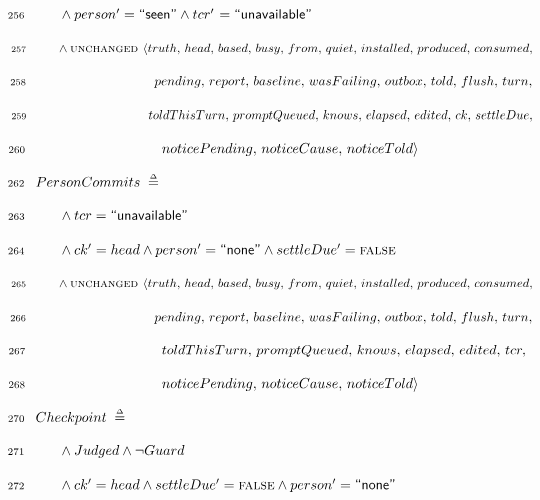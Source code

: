 \documentclass{article}
\makeatletter
\newcommand{\defeq}{\;\mathrel{\smash   %
    {{\stackrel{\scriptscriptstyle\Delta}{=}}}}\;}
\newcommand{\FALSE}{\textsc{false}}
\newcommand{\UNCHANGED}{\textsc{unchanged }}
\renewcommand{\_}{\rule{.4em}{.06em}\hspace{.05em}}
\newif\ifpcalshading \pcalshadingfalse
\newlength{\pcalvspace}\setlength{\pcalvspace}{0pt}%
\newcommand{\@pvspace}[1]{%
  \ifpcalshading
     \par\global\setlength{\pcalvspace}{#1}%
  \else
     \par\vspace{#1}%
  \fi
}
\renewcommand{\.}[1]{\ensuremath{\mbox{}#1\mbox{}}}
\newcommand{\@s}[1]{\hspace{#1pt}}
\newlength{\@xlen}
\newcommand\xtstrut%
  {\setlength{\@xlen}{1.05em}%
   \addtolength{\@xlen}{\pcalvspace}%
    \raisebox{\vshadelen}{\raisebox{-.25em}{\rule{0pt}{\@xlen}}}%
   \global\setlength{\vshadelen}{0pt}%
   \global\setlength{\pcalvspace}{0pt}}
\newcommand{\@x}[1]{\par
  \ifpcalshading
  \makebox[0pt][l]{\shadebox{\xtstrut\hspace*{\textwidth}}}%
  \fi
  \mbox{$\mbox{}#1\mbox{}$}}
\newcommand{\@w}[1]{\textsf{``{#1}''}}
\def\graymargin{1}
\newlength{\templena}
\newlength{\templenb}
\newcommand{\shadebox}[1]{{\setlength{\fboxsep}{\graymargin pt}%
     \savebox{\tempboxa}{#1}%
     \settoheight{\templena}{\usebox{\tempboxa}}%
     \settodepth{\templenb}{\usebox{\tempboxa}}%
     \hspace*{-\fboxsep}\raisebox{0pt}[\templena][\templenb]%
        {\colorbox{boxshade}{\usebox{\tempboxa}}}\hspace*{-\fboxsep}}}
\newlength{\vshadelen}
\makeatother
\begin{document}
 \@x{\makebox[0pt][r]{\scriptsize 256\hspace{1em}}\@s{16.4} \.{\land} person
 \.{'} \.{=}\@w{seen} \.{\land} tcr \.{'}\@s{0.80} \.{=}\@w{unavailable}}%
 \@x{\makebox[0pt][r]{\scriptsize 257\hspace{1em}}\@s{16.4} \.{\land}
 {\UNCHANGED} {\langle} truth ,\, head ,\, based ,\, busy ,\, from ,\, quiet
 ,\, installed ,\, produced ,\, consumed ,\,}%
 \@x{\makebox[0pt][r]{\scriptsize 258\hspace{1em}}\@s{89.98} pending ,\,
 report ,\, baseline ,\, wasFailing ,\, outbox ,\, told ,\, flush ,\, turn
 ,\,}%
 \@x{\makebox[0pt][r]{\scriptsize 259\hspace{1em}}\@s{89.98} toldThisTurn ,\,
 promptQueued ,\, knows ,\, elapsed ,\, edited ,\, ck ,\, settleDue ,\,}%
 \@x{\makebox[0pt][r]{\scriptsize 260\hspace{1em}}\@s{89.98} noticePending ,\,
 noticeCause ,\, noticeTold {\rangle}}%
\@pvspace{8.0pt}%
\@x{\makebox[0pt][r]{\scriptsize 262\hspace{1em}} PersonCommits \.{\defeq}}%
 \@x{\makebox[0pt][r]{\scriptsize 263\hspace{1em}}\@s{16.4} \.{\land} tcr
 \.{=}\@w{unavailable}}%
 \@x{\makebox[0pt][r]{\scriptsize 264\hspace{1em}}\@s{16.4} \.{\land} ck
 \.{'}\@s{0.13} \.{=} head \.{\land} person \.{'} \.{=}\@w{none} \.{\land}
 settleDue \.{'} \.{=} {\FALSE}}%
 \@x{\makebox[0pt][r]{\scriptsize 265\hspace{1em}}\@s{16.4} \.{\land}
 {\UNCHANGED} {\langle} truth ,\, head ,\, based ,\, busy ,\, from ,\, quiet
 ,\, installed ,\, produced ,\, consumed ,\,}%
 \@x{\makebox[0pt][r]{\scriptsize 266\hspace{1em}}\@s{89.98} pending ,\,
 report ,\, baseline ,\, wasFailing ,\, outbox ,\, told ,\, flush ,\, turn
 ,\,}%
 \@x{\makebox[0pt][r]{\scriptsize 267\hspace{1em}}\@s{89.98} toldThisTurn ,\,
 promptQueued ,\, knows ,\, elapsed ,\, edited ,\, tcr ,\,}%
 \@x{\makebox[0pt][r]{\scriptsize 268\hspace{1em}}\@s{89.98} noticePending ,\,
 noticeCause ,\, noticeTold {\rangle}}%
\@pvspace{8.0pt}%
\@x{\makebox[0pt][r]{\scriptsize 270\hspace{1em}} Checkpoint \.{\defeq}}%
 \@x{\makebox[0pt][r]{\scriptsize 271\hspace{1em}}\@s{16.4} \.{\land} Judged
 \.{\land} {\lnot} Guard}%
 \@x{\makebox[0pt][r]{\scriptsize 272\hspace{1em}}\@s{16.4} \.{\land} ck \.{'}
 \.{=} head \.{\land} settleDue \.{'} \.{=} {\FALSE} \.{\land} person \.{'}
 \.{=}\@w{none}}%
\end{document}
